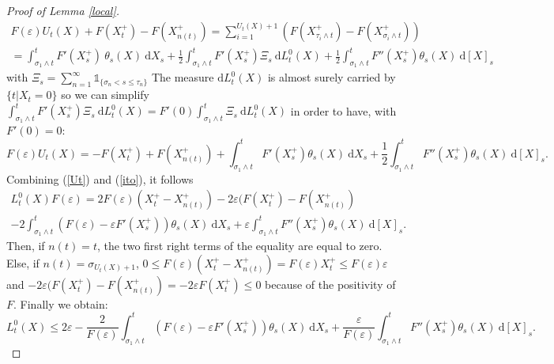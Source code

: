 \documentclass[11pt]{article}
\newcommand{\di}{\mathrm{d}}
\begin{document}
\begin{proof}[Proof of Lemma \ref{local}]
\begin{multline*}
        F(\varepsilon)U_t(X)+F\left(X^+_t\right)-F\left(X^+_{n(t)}\right) = \sum_{i=1}^{U_t(X)+1} \left(F\left(X^+_{\tau_i\wedge t}\right) - F\left(X^+_{\sigma_i\wedge t}\right)\right)\\=\int_{\sigma_1\wedge t}^{ t} F'(X_s^+)\ \theta_s(X)\ \di X_s + \frac{1}{2}\int_{\sigma_1\wedge t}^{t} F'\left(X_s^+\right)\Xi_s\ \di L^0_t(X) + \frac{1}{2}\int_{\sigma_1\wedge t}^{t} F''\left(X_s^+\right)\theta_s(X)\ \di [X]_s
        \end{multline*}
        with $\Xi_s = \sum_{n=1}^\infty \mathds{1}_{\{\sigma_n<s\leq\tau_n\}}$
        The measure $\di L^0_t(X)$ is almost surely carried by $\{t|X_t=0\}$ so we can simplify $\int_{\sigma_1\wedge t}^{t} F'\left(X_s^+\right)\Xi_s\ \di L^0_t(X) =F'(0)\int_{\sigma_1\wedge t}^{t} \Xi_s\ \di L^0_t(X)$ in order to have, with $F'(0)=0$:
        \begin{equation}\label{ito}
        F(\varepsilon)U_t(X) = - F\left(X^+_t\right) + F\left(X^+_{n(t)}\right) + \int_{\sigma_1\wedge t}^{ t} F'\left(X_s^+\right) \theta_s(X)\ \di X_s + \frac{1}{2}\int_{\sigma_1\wedge t}^{t} F''\left(X_s^+\right) \theta_s(X)\ \di [X]_s.
        \end{equation}
        Combining (\ref{Ut}) and (\ref{ito}), it follows
        \begin{multline*}
        L^0_t(X) F(\varepsilon) = 2 F(\varepsilon)(X^+_t-X^+_{n(t)})-2\varepsilon(F\left(X^+_t\right)-F\left(X^+_{n(t)}\right)\\-2\int_{\sigma_1\wedge t}^{ t} \left(F(\varepsilon) - \varepsilon F'\left(X_s^+\right)\right) \theta_s(X)\ \di X_s + \varepsilon\int_{\sigma_1\wedge t}^{t} F''\left(X_s^+\right)\theta_s(X)\ \di [X]_s.
        \end{multline*}
        Then, if $n(t) = t$, the two first right terms of the equality are equal to zero. Else, if $n(t) = \sigma_{U_t(X)+1}$, $0\leq F(\varepsilon)(X^+_t-X^+_{n(t)})=F(\varepsilon)X^+_t\leq F(\varepsilon)\varepsilon$ and $-2\varepsilon(F\left(X^+_t\right)-F\left(X^+_{n(t)}\right)=-2\varepsilon F\left(X^+_t\right)\leq0$ because of the positivity of $F$. Finally we obtain:
        \begin{equation*}
        L^0_t(X) \leq 2 \varepsilon-\frac{2}{F(\varepsilon)}\int_{\sigma_1\wedge t}^{ t} \left(F(\varepsilon) - \varepsilon F'\left(X_s^+\right)\right) \theta_s(X)\ \di X_s + \frac{\varepsilon}{F(\varepsilon)}\int_{\sigma_1\wedge t}^{t} F''\left(X_s^+\right)\theta_s(X)\ \di [X]_s.
        \end{equation*}
    \end{proof}
\end{document}
